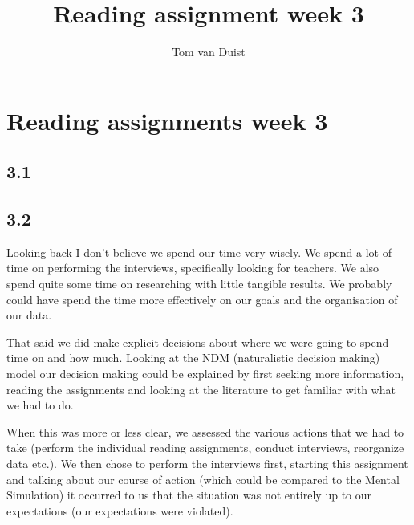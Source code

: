 

\title{Reading assignment week 3}
\newcommand{\TitelAbbr}{}
\newcommand{\Version}{0.1}



\what{}
\supervisors{}
\author{Tom van Duist}




\maketitle

\clearpage


\chapter*{Reading assignments week 3}

\section*{3.1}



\section*{3.2}
Looking back I don't believe we spend our time very wisely. We spend a lot of time on performing the interviews, specifically looking for teachers. We also spend quite some time on researching with little tangible results. We probably could have spend the time more effectively on our goals and the organisation of our data.

That said we did make explicit decisions about where we were going to spend time on and how much. Looking at the NDM (naturalistic decision making) model our decision making could be explained by first seeking more information, reading the assignments and looking at the literature to get familiar with what we had to do.

When this was more or less clear, we assessed the various actions that we had to take (perform the individual reading assignments, conduct interviews, reorganize data etc.). We then chose to perform the interviews first, starting this assignment and talking about our course of action (which could be compared to the Mental Simulation) it occurred to us that the situation was not entirely up to our expectations (our expectations were violated).

